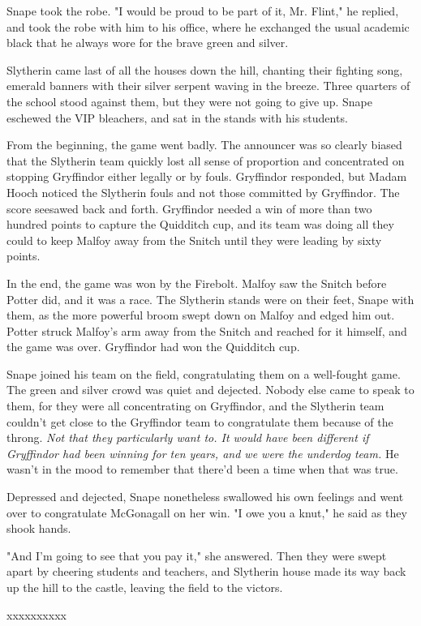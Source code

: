\documentclass[a4paper,11pt]{article}
\begin{document}
Snape took the robe. "I would be proud to be part of it, Mr. Flint," he replied, and took the robe with him to his office, where he exchanged the usual academic black that he always wore for the brave green and silver.

Slytherin came last of all the houses down the hill, chanting their fighting song, emerald banners with their silver serpent waving in the breeze. Three quarters of the school stood against them, but they were not going to give up. Snape eschewed the VIP bleachers, and sat in the stands with his students.

From the beginning, the game went badly. The announcer was so clearly biased that the Slytherin team quickly lost all sense of proportion and concentrated on stopping Gryffindor either legally or by fouls. Gryffindor responded, but Madam Hooch noticed the Slytherin fouls and not those committed by Gryffindor. The score seesawed back and forth. Gryffindor needed a win of more than two hundred points to capture the Quidditch cup, and its team was doing all they could to keep Malfoy away from the Snitch until they were leading by sixty points.

In the end, the game was won by the Firebolt. Malfoy saw the Snitch before Potter did, and it was a race. The Slytherin stands were on their feet, Snape with them, as the more powerful broom swept down on Malfoy and edged him out. Potter struck Malfoy's arm away from the Snitch and reached for it himself, and the game was over. Gryffindor had won the Quidditch cup.

Snape joined his team on the field, congratulating them on a well-fought game. The green and silver crowd was quiet and dejected. Nobody else came to speak to them, for they were all concentrating on Gryffindor, and the Slytherin team couldn't get close to the Gryffindor team to congratulate them because of the throng. \emph{Not that they particularly want to. It would have been different if Gryffindor had been winning for ten years, and we were the underdog team. }He wasn't in the mood to remember that there'd been a time when that was true.

Depressed and dejected, Snape nonetheless swallowed his own feelings and went over to congratulate McGonagall on her win. "I owe you a knut," he said as they shook hands.

"And I'm going to see that you pay it," she answered. Then they were swept apart by cheering students and teachers, and Slytherin house made its way back up the hill to the castle, leaving the field to the victors.

xxxxxxxxxx
\end{document}
